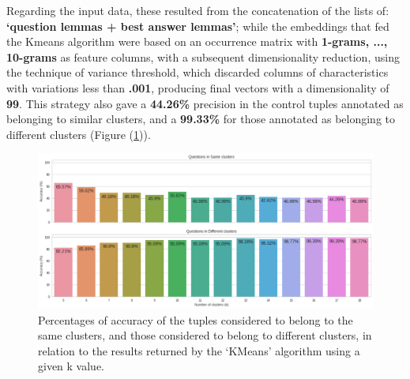 Regarding the input data, these resulted from the concatenation of the lists of: \textbf{`question lemmas + best answer lemmas'}; while the embeddings that fed the Kmeans algorithm were based on an occurrence matrix with \textbf{1-grams, ..., 10-grams} as feature columns, with a subsequent dimensionality reduction, using the technique of variance threshold, which discarded columns of characteristics with variations less than \textbf{.001}, producing final vectors with a dimensionality of \textbf{99}.
This strategy also gave a \textbf{44.26\%} precision in the control tuples annotated as belonging to similar clusters, and a \textbf{99.33\%} for those annotated as belonging to different clusters (Figure (\ref{fig:metrics})).

\begin{figure}[ht!]
    \centering
    \includegraphics[width=\linewidth]{images/pre/metricts_opc2_clustering.pdf}
    \caption{Percentages of accuracy of the tuples considered to belong to the same clusters, and those considered to belong to different clusters, in relation to the results returned by the `KMeans' algorithm using a given k value.}
\label{fig:metrics}
\end{figure}

